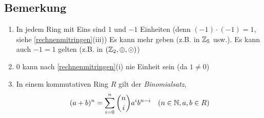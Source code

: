 \subsection{Bemerkung}

\begin{enumerate}
	\item
	In jedem Ring mit Eins sind $1$ und $-1$ Einheiten (denn $(-1) \cdot (-1) = 1$, siehe \ref{rechnenmitringen}(iii))
	Es kann mehr geben (z.B. in $\mathbb{Z}_5$ usw.).
	Es kann auch $-1 = 1$ gelten (z.B. in $(\mathbb{Z}_2, \oplus, \odot)$)
	
	\item
	$0$ kann nach  \ref{rechnenmitringen}(i) nie Einheit sein (da $1 \neq 0$)
	
	\item
	In einem kommutativen Ring $R$ gilt der \emph{Binomialsatz},
	\[(a+b)^n = \sum_{i=0}^{n}\binom{n}{i}a^ib^{n-i} \quad (n \in \mathbb{N}, a, b \in R)\]
	
	
\end{enumerate}